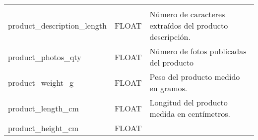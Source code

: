 \documentclass[11pt]{article}
\begin{document}
\begin{longtable}[]{@{}lll@{}}
\begin{minipage}[t]{0.30\columnwidth}
\end{minipage}\tabularnewline
\begin{minipage}[t]{0.30\columnwidth}\raggedright
product\_description\_length\strut
\end{minipage} & \begin{minipage}[t]{0.30\columnwidth}\raggedright
FLOAT\strut
\end{minipage} & \begin{minipage}[t]{0.30\columnwidth}\raggedright
Número de caracteres extraídos del producto descripción.\strut
\end{minipage}\tabularnewline
\begin{minipage}[t]{0.30\columnwidth}\raggedright
product\_photos\_qty\strut
\end{minipage} & \begin{minipage}[t]{0.30\columnwidth}\raggedright
FLOAT\strut
\end{minipage} & \begin{minipage}[t]{0.30\columnwidth}\raggedright
Número de fotos publicadas del producto\strut
\end{minipage}\tabularnewline
\begin{minipage}[t]{0.30\columnwidth}\raggedright
product\_weight\_g\strut
\end{minipage} & \begin{minipage}[t]{0.30\columnwidth}\raggedright
FLOAT\strut
\end{minipage} & \begin{minipage}[t]{0.30\columnwidth}\raggedright
Peso del producto medido en gramos.\strut
\end{minipage}\tabularnewline
\begin{minipage}[t]{0.30\columnwidth}\raggedright
product\_length\_cm\strut
\end{minipage} & \begin{minipage}[t]{0.30\columnwidth}\raggedright
FLOAT\strut
\end{minipage} & \begin{minipage}[t]{0.30\columnwidth}\raggedright
Longitud del producto medida en centímetros.\strut
\end{minipage}\tabularnewline
\begin{minipage}[t]{0.30\columnwidth}\raggedright
product\_height\_cm\strut
\end{minipage} & \begin{minipage}[t]{0.30\columnwidth}\raggedright
FLOAT\strut
\end{minipage} & \begin{minipage}[t]{0.30\columnwidth}\raggedright

\end{minipage}
\end{longtable}
\end{document}
